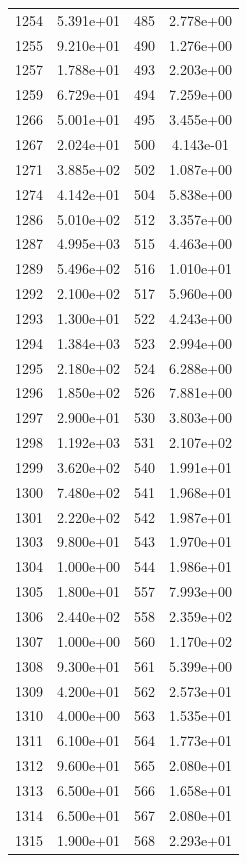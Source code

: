 \documentclass[12pt]{article}
\begin{document}
\begin{longtable}{@{}cccc@{}}
1254 & 5.391e+01 & 485 & 2.778e+00 \\
1255 & 9.210e+01 & 490 & 1.276e+00 \\
1257 & 1.788e+01 & 493 & 2.203e+00 \\
1259 & 6.729e+01 & 494 & 7.259e+00 \\
1266 & 5.001e+01 & 495 & 3.455e+00 \\
1267 & 2.024e+01 & 500 & 4.143e-01 \\
1271 & 3.885e+02 & 502 & 1.087e+00 \\
1274 & 4.142e+01 & 504 & 5.838e+00 \\
1286 & 5.010e+02 & 512 & 3.357e+00 \\
1287 & 4.995e+03 & 515 & 4.463e+00 \\
1289 & 5.496e+02 & 516 & 1.010e+01 \\
1292 & 2.100e+02 & 517 & 5.960e+00 \\
1293 & 1.300e+01 & 522 & 4.243e+00 \\
1294 & 1.384e+03 & 523 & 2.994e+00 \\
1295 & 2.180e+02 & 524 & 6.288e+00 \\
1296 & 1.850e+02 & 526 & 7.881e+00 \\
1297 & 2.900e+01 & 530 & 3.803e+00 \\
1298 & 1.192e+03 & 531 & 2.107e+02 \\
1299 & 3.620e+02 & 540 & 1.991e+01 \\
1300 & 7.480e+02 & 541 & 1.968e+01 \\
1301 & 2.220e+02 & 542 & 1.987e+01 \\
1303 & 9.800e+01 & 543 & 1.970e+01 \\
1304 & 1.000e+00 & 544 & 1.986e+01 \\
1305 & 1.800e+01 & 557 & 7.993e+00 \\
1306 & 2.440e+02 & 558 & 2.359e+02 \\
1307 & 1.000e+00 & 560 & 1.170e+02 \\
1308 & 9.300e+01 & 561 & 5.399e+00 \\
1309 & 4.200e+01 & 562 & 2.573e+01 \\
1310 & 4.000e+00 & 563 & 1.535e+01 \\
1311 & 6.100e+01 & 564 & 1.773e+01 \\
1312 & 9.600e+01 & 565 & 2.080e+01 \\
1313 & 6.500e+01 & 566 & 1.658e+01 \\
1314 & 6.500e+01 & 567 & 2.080e+01 \\
1315 & 1.900e+01 & 568 & 2.293e+01 \\

\end{longtable}
\end{document}

